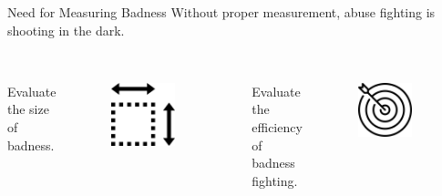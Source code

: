 \documentclass[nobackground,dvipsnames,table,aspectratio=169]{beamer}
\begin{document}
\begin{frame}{Need for Measuring Badness}
    \centering
    Without proper measurement, abuse fighting is shooting in the dark. \\~\\
    \begin{columns}[T]
        \small
            \centering
            Evaluate the size of badness.\\
            \begin{figure}
                \includegraphics[width=0.75\textwidth]{size-of-badness}
            \end{figure}
            \centering
            Evaluate the efficiency of badness fighting.\\
            \begin{figure}
                \includegraphics[width=0.75\textwidth]{efficiency-of-badness-fighting}

\end{figure}
\end{columns}
\end{frame}
\end{document}
